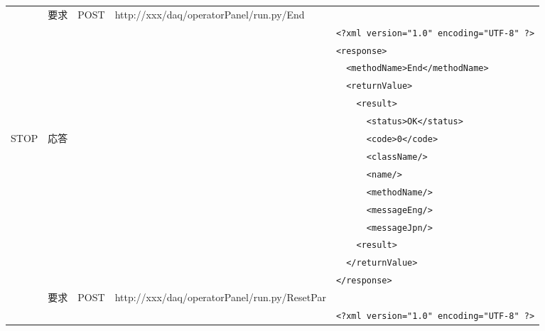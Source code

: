 \documentclass[a4j,10pt,dvips,onecolumn,oneside,final]{jarticle}%
\begin{document}
\begin{table}[htbp]
\begin{center}
{\begin{tabular}{|c|c|c|l|l|}
                  & 要求      & POST & http://xxx/daq/operatorPanel/run.py/End    & \\ \cline{2-5}
                  &           &      &                                            & \verb|<?xml version="1.0" encoding="UTF-8" ?>|\\
                  &           &      &                                            & \verb|<response>|\\ 
                  &           &      &                                            & \verb|  <methodName>End</methodName>|\\ 
                  &           &      &                                            & \verb|  <returnValue>|\\ 
                  &           &      &                                            & \verb|    <result>|\\ 
                  &           &      &                                            & \verb|      <status>OK</status>|\\ 
      STOP        & 応答      &      &                                            & \verb|      <code>0</code>|\\ 
                  &           &      &                                            & \verb|      <className/>|\\ 
                  &           &      &                                            & \verb|      <name/>|\\ 
                  &           &      &                                            & \verb|      <methodName/>|\\ 
                  &           &      &                                            & \verb|      <messageEng/>|\\ 
                  &           &      &                                            & \verb|      <messageJpn/>|\\ 
                  &           &      &                                            & \verb|    <result>|\\
                  &           &      &                                            & \verb|  </returnValue>|\\ 
                  &           &      &                                            & \verb|</response>|\\ \hline
                  & 要求      & POST & http://xxx/daq/operatorPanel/run.py/ResetPar & \\ \cline{2-5}
                  &           &      &                                            & \verb|<?xml version="1.0" encoding="UTF-8" ?>|\\

\end{tabular}}
\end{center}
\end{table}
\end{document}
